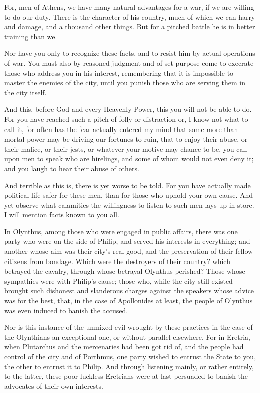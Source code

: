 \documentclass[a4paper]{amsbook}
\begin{document}
For, men of Athens, we have many natural advantages for a war, if we are willing to do our duty. There is the character of his country, much of which we can harry and damage, and a thousand other things. But for a pitched battle he is in better training than we.

Nor have you only to recognize these facts, and to resist him by actual operations of war. You must also by reasoned judgment and of set purpose come to execrate those who address you in his interest, remembering that it is impossible to master the enemies of the city, until you punish those who are serving them in the city itself.

And this, before God and every Heavenly Power, this you will not be able to do. For you have reached such a pitch of folly or distraction or, I know not what to call it, for often has the fear actually entered my mind that some more than mortal power may be driving our fortunes to ruin, that to enjoy their abuse, or their malice, or their jests, or whatever your motive may chance to be, you call upon men to speak who are hirelings, and some of whom would not even deny it; and you laugh to hear their abuse of others.

And terrible as this is, there is yet worse to be told. For you have actually made political life safer for these men, than for those who uphold your own cause. And yet observe what calamities the willingness to listen to such men lays up in store. I will mention facts known to you all.

In Olynthus, among those who were engaged in public affairs, there was one party who were on the side of Philip, and served his interests in everything; and another whose aim was their city's real good, and the preservation of their fellow citizens from bondage. Which were the destroyers of their country? which betrayed the cavalry, through whose betrayal Olynthus perished? Those whose sympathies were with Philip's cause; those who, while the city still existed brought such dishonest and slanderous charges against the speakers whose advice was for the best, that, in the case of Apollonides at least, the people of Olynthus was even induced to banish the accused.

Nor is this instance of the unmixed evil wrought by these practices in the case of the Olynthians an exceptional one, or without parallel elsewhere. For in Eretria, when Plutarchus and the mercenaries had been got rid of, and the people had control of the city and of Porthmus, one party wished to entrust the State to you, the other to entrust it to Philip. And through listening mainly, or rather entirely, to the latter, these poor luckless Eretrians were at last persuaded to banish the advocates of their own interests.
\end{document}
